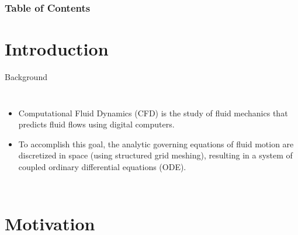 
\usepackage{subfig}




\frame{\titlepage}

\begin{frame}[plain]
    \frametitle{Table of Contents}
    \tableofcontents
\end{frame}

\section{Introduction}

\begin{frame}{Background}
\begin{columns}
        \begin{itemize}
        \item Computational Fluid Dynamics (CFD) is the study of fluid mechanics that predicts fluid flows using digital computers.
        \item To accomplish this goal, the analytic governing equations of fluid motion are discretized in space (using structured grid meshing), resulting in a system of coupled ordinary differential equations (ODE).
        \end{itemize}   
    \end{columns}
\end{frame}

\section{Motivation}

